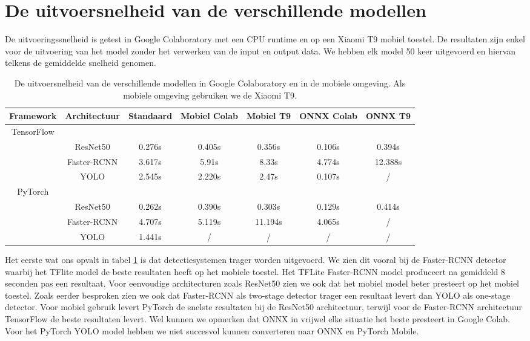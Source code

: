 \section{De uitvoersnelheid van de verschillende modellen}
De uitvoeringssnelheid is getest in Google Colaboratory met een CPU runtime en op een Xiaomi T9 mobiel toestel.
De resultaten zijn enkel voor de uitvoering van het model zonder het verwerken van de input en output data.
We hebben elk model 50 keer uitgevoerd en hiervan telkens de gemiddelde snelheid genomen.

\begin{table}[!ht]
    \caption{De uitvoersnelheid van de verschillende modellen in Google Colaboratory en in de mobiele omgeving. Als mobiele omgeving gebruiken we de Xiaomi T9.}
\begin{tabular}{ccccccc}
    \hline
    Framework & Architectuur & Standaard & Mobiel Colab & Mobiel T9 & ONNX Colab & ONNX T9\\
    \hline
    TensorFlow & & & & \\
     & ResNet50 & 0.276s & 0.405s & 0.356s & 0.106s & 0.394s \\
     & Faster-RCNN & 3.617s & 5.91s & 8.33s & 4.774s & 12.388s \\
     & YOLO & 2.545s & 2.220s & 2.47s & 0.107s & / \\
    PyTorch & & & & \\
    & ResNet50 & 0.262s & 0.390s & 0.303s & 0.129s & 0.414s \\
    & Faster-RCNN & 4.707s & 5.119s & 11.194s & 4.065s & / \\
    & YOLO & 1.441s & / & / & / & / \\
    \hline
\end{tabular}
\label{tab:speed}
\end{table}

Het eerste wat ons opvalt in tabel \ref{tab:speed} is dat detectiesystemen trager worden uitgevoerd.
We zien dit vooral bij de Faster-RCNN detector waarbij het TFlite model de beste resultaten heeft op het mobiele toestel.
Het TFLite Faster-RCNN model produceert na gemiddeld 8 seconden pas een resultaat.
Voor eenvoudige architecturen zoals ResNet50 zien we ook dat het mobiel model beter presteert op het mobiel toestel.
Zoals eerder besproken zien we ook dat Faster-RCNN als two-stage detector trager een resultaat levert dan YOLO als one-stage detector.
Voor mobiel gebruik levert PyTorch de snelste resultaten bij de ResNet50 architectuur, terwijl voor de Faster-RCNN architectuur TensorFlow de beste resultaten levert.
Wel kunnen we opmerken dat ONNX in vrijwel elke situatie het beste presteert in Google Colab.
Voor het PyTorch YOLO model hebben we niet succesvol kunnen converteren naar ONNX en PyTorch Mobile.

